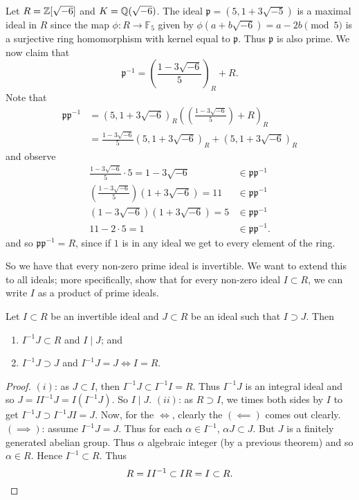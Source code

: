 \begin{example}[]
	Let $R = \mathbb{Z}[\sqrt{-6}]$ and $K = \mathbb{Q}(\sqrt{-6})$.
	The ideal 
	$
		\mathfrak p = (5, 1 + 3\sqrt{-5})
	$
	is a maximal ideal in $R$ since the map
	$\phi: R \to \mathbb F_5$
	given by $\phi(a + b\sqrt{-6}) = a - 2b \pmod 5$
	is a surjective ring homomorphism with kernel equal to
	$\mathfrak p$. 
	Thus $\mathfrak p$ is also prime.
	We now claim that
	\[
		\mathfrak p^{-1}
		= \left( 
			\frac{1 - 3\sqrt{-6}}{5} 
		\right)_R + R.
	\]
	Note that
	\begin{align*}
		\mathfrak p \mathfrak p^{-1}
		&= (5, 1 + 3\sqrt{-6})_R \left( 
			\left( 
				\frac{1 - 3\sqrt{-6}}{5} 
			\right) + R
		\right)_R \\
		&= \frac{1-3\sqrt{-6}}{5} (5,1+3\sqrt{-6})_R
			+ (5, 1 + 3\sqrt{-6})_R
	\end{align*}
	and observe
	\begin{align*}
		\frac{1 - 3\sqrt{-6}}{5} \cdot 5 
			= 1 - 3\sqrt{-6} &\in \mathfrak p \mathfrak p^{-1} \\
		\left( 
			\frac{1 - 3\sqrt{-6}}{5}
		\right)
		\left( 
			1 + 3 \sqrt{-6} 
		\right)
			= 11 &\in \mathfrak p \mathfrak p^{-1} \\
		(1-3\sqrt{-6})(1 + 3\sqrt{-6}) 
			= 5 &\in \mathfrak p \mathfrak p^{-1} \\
		11 - 2 \cdot 5 = 1 &\in \mathfrak p \mathfrak p^{-1}.
	\end{align*}
	and so $\mathfrak p \mathfrak p^{-1} = R$, 
	since if $1$ is in any ideal we get to every element of the ring.
\end{example}

So we have that every non-zero prime ideal is invertible.
We want to extend this to all ideals; more specifically,
show that for every non-zero ideal $I \subset R$, we can write
$I$ as a product of prime ideals.

\begin{lemma}[]
	Let $I \subset R$ be an invertible ideal
	and $J \subset R$ be an ideal such that $I \supset J$.
	Then
	\begin{enumerate}
		\item $I^{-1} J \subset R$ and $I \mid J$; and
		\item $I^{-1} J \supset J$ and $I^{-1} J = J \iff I = R$.
	\end{enumerate}
\end{lemma}

\begin{proof}
	$(i)$: as $J \subset I$, then $I^{-1} J \subset I^{-1} I = R$.
	Thus $I^{-1}J$ is an integral ideal and so 
	$J = I I^{-1} J = I(I^{-1}J)$.
	So $I \mid J$.
	$(ii)$: as $R \supset I$, we times both sides by $I$ to get 
	$I^{-1} J \supset I^{-1} J I = J$.
	Now, for the $\iff$, clearly the $(\impliedby)$ comes out clearly.
	$(\implies)$: assume $I^{-1} J = J$.
	Thus for each $\alpha \in I^{-1}$, $\alpha J \subset J$.
	But $J$ is a finitely generated abelian group.
	Thus $\alpha$ algebraic integer (by a previous theorem) and
	so $\alpha \in R$.
	Hence $I^{-1} \subset R$.
	Thus 
	\[
		R = II^{-1} \subset IR = I \subset R. \qedhere
	\]
\end{proof}

